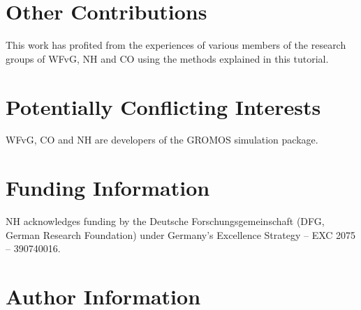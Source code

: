 \documentclass[9pt,tutorial]{../includes/livecoms}
\newcommand{\githubrepository}{\url{https://github.com/hansenniels/gromos_tutorial_livecoms}}  %
\begin{document}

\section{Other Contributions}

%
This work has profited from the experiences of various members of the research groups of  WFvG, NH and CO using the methods explained in this tutorial.


\section{Potentially Conflicting Interests}
WFvG, CO and NH are developers of the GROMOS simulation package.

\section{Funding Information}
NH acknowledges funding by the Deutsche Forschungsgemeinschaft (DFG, German Research Foundation) under Germany’s Excellence Strategy – EXC 2075 – 390740016.

\section*{Author Information}
\makeorcid




\end{document}
